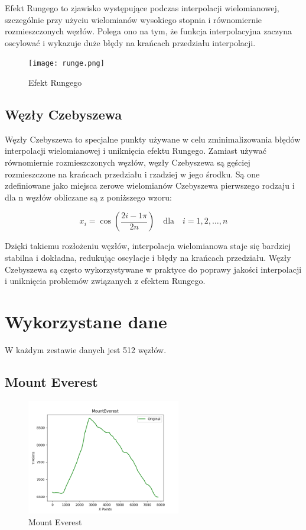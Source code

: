\documentclass{article}
\begin{document}
Efekt Rungego to zjawisko występujące podczas interpolacji wielomianowej, szczególnie przy użyciu wielomianów wysokiego stopnia i równomiernie rozmieszczonych węzłów. Polega ono na tym, że funkcja interpolacyjna zaczyna oscylować i wykazuje duże błędy na krańcach przedziału interpolacji.

\begin{figure}[h]
    \centering
    \texttt{[image: runge.png]}
    \caption{Efekt Rungego}
\end{figure}

\subsection{Węzły Czebyszewa}

Węzły Czebyszewa to specjalne punkty używane w celu zminimalizowania błędów interpolacji wielomianowej i uniknięcia efektu Rungego. Zamiast używać równomiernie rozmieszczonych węzłów, węzły Czebyszewa są gęściej rozmieszczone na krańcach przedziału i rzadziej w jego środku. Są one zdefiniowane jako miejsca zerowe wielomianów Czebyszewa pierwszego rodzaju i dla n węzłów obliczane są z poniższego wzoru:

\begin{equation}
    x_i = \cos\left(\frac{{2i - 1} \pi}{2n}\right) \quad \text{dla} \quad i = 1, 2, \ldots, n
\end{equation}


Dzięki takiemu rozłożeniu węzłów, interpolacja wielomianowa staje się bardziej stabilna i dokładna, redukując oscylacje i błędy na krańcach przedziału. Węzły Czebyszewa są często wykorzystywane w praktyce do poprawy jakości interpolacji i uniknięcia problemów związanych z efektem Rungego.

\clearpage
\section{Wykorzystane dane}

W każdym zestawie danych jest 512 węzłów.

\subsection{Mount Everest}

\begin{figure}[h]
    \centering
    \includegraphics[width=0.6\textwidth]{plots/MountEverest_original.png}
    \caption{Mount Everest}
\end{figure}
\end{document}
